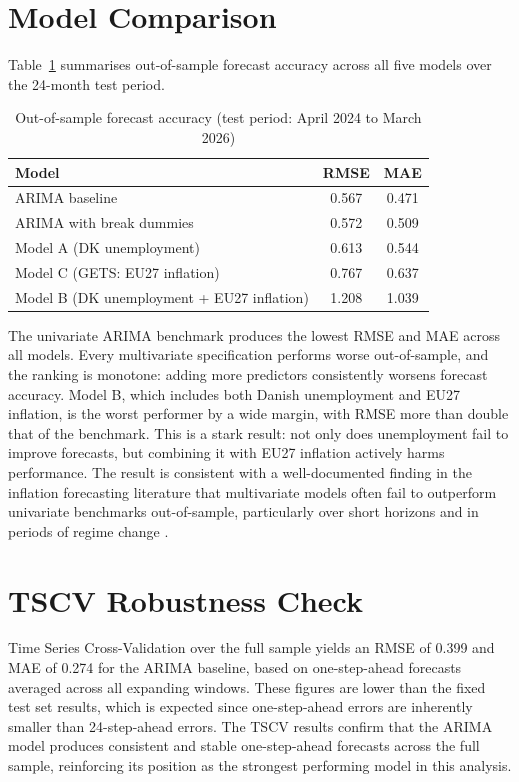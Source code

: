 \section{Model Comparison}

Table~\ref{tab:model_comparison} summarises out-of-sample forecast accuracy 
across all five models over the 24-month test period.

\begin{table}[H]
\centering
\caption{Out-of-sample forecast accuracy (test period: April 2024 to March 2026)}
\begin{tabular}{lcc}
\hline
Model & RMSE & MAE \\
\hline
ARIMA baseline             & 0.567 & 0.471 \\
ARIMA with break dummies   & 0.572 & 0.509 \\
Model A (DK unemployment)  & 0.613 & 0.544 \\
Model C (GETS: EU27 inflation) & 0.767 & 0.637 \\
Model B (DK unemployment + EU27 inflation) & 1.208 & 1.039 \\
\hline
\end{tabular}
\label{tab:model_comparison}
\end{table}

The univariate ARIMA benchmark produces the lowest RMSE and MAE across all 
models. Every multivariate specification performs worse out-of-sample, and the 
ranking is monotone: adding more predictors consistently worsens forecast 
accuracy. Model B, which includes both Danish unemployment and EU27 inflation, 
is the worst performer by a wide margin, with RMSE more than double that of the 
benchmark. This is a stark result: not only does unemployment fail to improve 
forecasts, but combining it with EU27 inflation actively harms performance. The 
result is consistent with a well-documented finding in the inflation forecasting 
literature that multivariate models often fail to outperform univariate 
benchmarks out-of-sample, particularly over short horizons and in periods of 
regime change \parencite{stock_watson_2008}.

\section{TSCV Robustness Check}

Time Series Cross-Validation over the full sample yields an RMSE of 0.399 and 
MAE of 0.274 for the ARIMA baseline, based on one-step-ahead forecasts averaged 
across all expanding windows. These figures are lower than the fixed test set 
results, which is expected since one-step-ahead errors are inherently smaller 
than 24-step-ahead errors. The TSCV results confirm that the ARIMA model 
produces consistent and stable one-step-ahead forecasts across the full sample, 
reinforcing its position as the strongest performing model in this analysis.